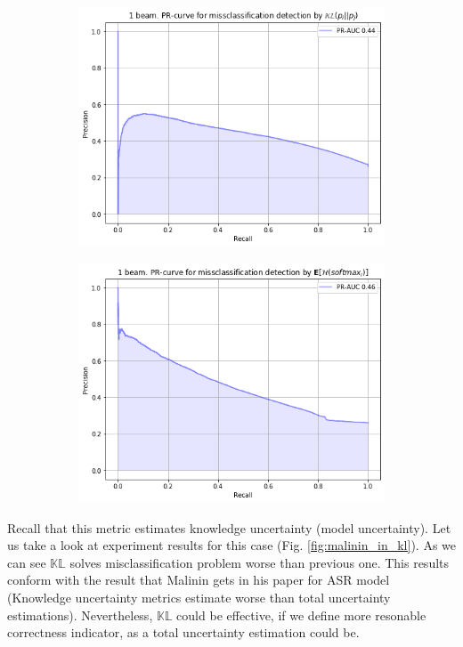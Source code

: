 \documentclass[a4paper,14pt]{extarticle}
\begin{document}
	\begin{figure}[t]
		\begin{subfigure}{.45\textwidth}
			\includegraphics[width=\textwidth]{images/malinin_in_kl.png}
		\end{subfigure}
		\begin{subfigure}{.45\textwidth}
			\includegraphics[width=\textwidth]{images/malinin_in_du.png}
		\end{subfigure}
	\end{figure}
	Recall that this metric estimates knowledge uncertainty (model uncertainty). Let us take a look at experiment results for this case (Fig. \ref{fig:malinin_in_kl}). As we can see $\mathbb{KL}$ solves misclassification problem worse than previous one. This results conform with the result that Malinin gets in his paper for ASR model (Knowledge uncertainty metrics estimate worse than total uncertainty estimations). Nevertheless, $\mathbb{KL}$ could be effective, if we define more resonable correctness indicator, as a total uncertainty estimation could be. 
	
\end{document}
